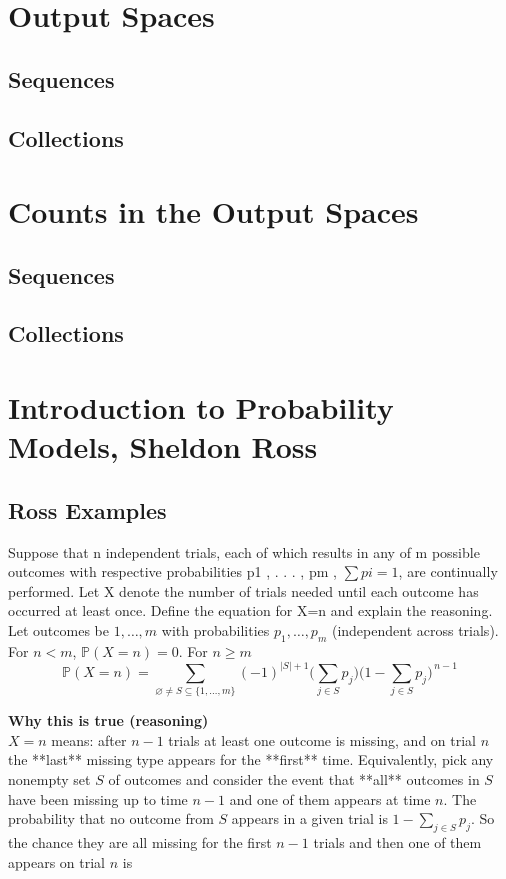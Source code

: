 \documentclass{book}
\begin{document}
\section{Output Spaces}
\subsection*{Sequences}
\subsection*{Collections}
\section{Counts in the Output Spaces}
\subsection*{Sequences}
\subsection*{Collections}


\section{Introduction to Probability Models, Sheldon Ross}
\subsection*{Ross Examples}

Suppose that n independent trials, each of which results in any of m possible outcomes with respective probabilities p1 , . . . , pm , $\sum pi = 1$, are continually performed. Let X denote the number of trials needed until each outcome has occurred at least once. Define the equation for X=n and explain the reasoning.\\


Let outcomes be $1,\dots,m$ with probabilities $p_1,\dots,p_m$ (independent across trials). For $n<m$, $\mathbb{P}(X=n)=0$. For $n\ge m$\\

$$
\boxed{\;\mathbb{P}(X=n)=\sum_{\varnothing\neq S\subseteq\{1,\dots,m\}}
(-1)^{|S|+1}\Big(\sum_{j\in S}p_j\Big)\Big(1-\sum_{j\in S}p_j\Big)^{\,n-1}\;}
$$

\textbf{Why this is true (reasoning)}\\

$X=n$ means: after $n-1$ trials at least one outcome is missing, and on trial $n$ the **last** missing type appears for the **first** time. Equivalently, pick any nonempty set $S$ of outcomes and consider the event that **all** outcomes in $S$ have been missing up to time $n-1$ and one of them appears at time $n$. The probability that no outcome from $S$ appears in a given trial is $1-\sum_{j\in S}p_j$. So the chance they are all missing for the first $n-1$ trials and then one of them appears on trial $n$ is
\end{document}
